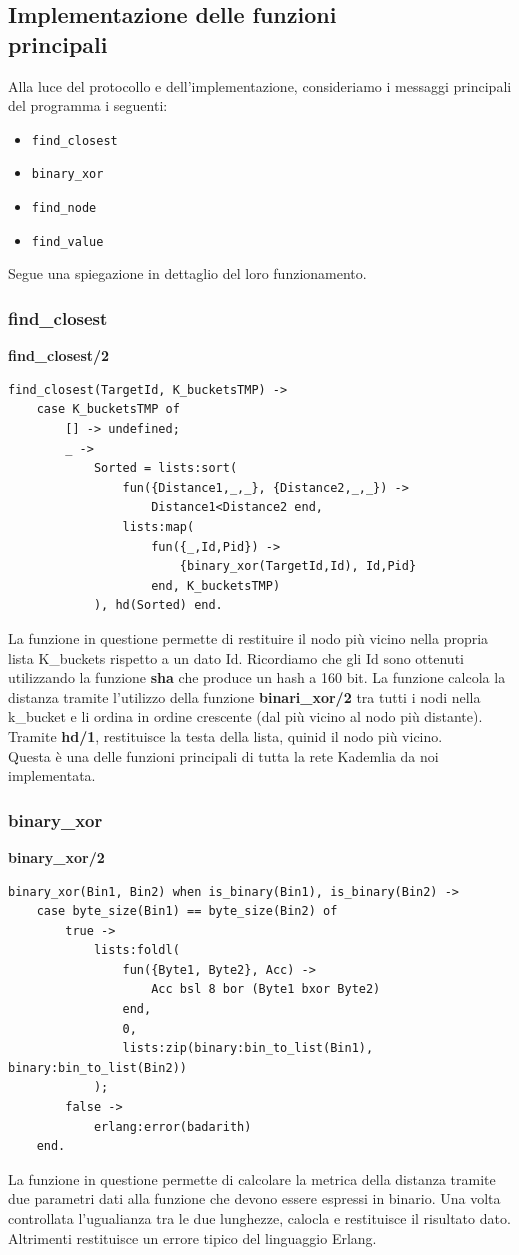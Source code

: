 \documentclass{article}
\begin{document}
\subsection{Implementazione delle funzioni \\ principali}
Alla luce del protocollo e dell'implementazione, consideriamo i messaggi principali del programma i seguenti:
\begin{itemize}
    \item \texttt{find\_closest}
    \item {\texttt{binary\_xor}}
    \item \texttt{find\_node}
    \item \texttt{find\_value}
\end{itemize}
Segue una spiegazione in dettaglio del loro funzionamento.
\subsubsection{find\_closest}
\textbf{find\_closest/2}
\begin{lstlisting}
find_closest(TargetId, K_bucketsTMP) ->
    case K_bucketsTMP of
        [] -> undefined;
        _ ->
            Sorted = lists:sort(
                fun({Distance1,_,_}, {Distance2,_,_}) ->
                    Distance1<Distance2 end,
                lists:map(
                    fun({_,Id,Pid}) ->
                        {binary_xor(TargetId,Id), Id,Pid}
                    end, K_bucketsTMP)
            ), hd(Sorted) end.
\end{lstlisting}
La funzione in questione permette di restituire il nodo più vicino nella propria lista K\_buckets rispetto a un dato Id. Ricordiamo che gli Id sono ottenuti utilizzando la funzione \textbf{sha} che produce un hash a 160 bit. La funzione calcola la distanza tramite l'utilizzo della funzione \textbf{binari\_xor/2} tra tutti i nodi nella k\_bucket e li ordina in ordine crescente (dal più vicino al nodo più distante). Tramite \textbf{hd/1}, restituisce la testa della lista, quinid il nodo più vicino.\\ 
Questa è una delle funzioni principali di tutta la rete Kademlia da noi implementata.
\subsubsection{binary\_xor}
\textbf{binary\_xor/2}
\begin{lstlisting}
binary_xor(Bin1, Bin2) when is_binary(Bin1), is_binary(Bin2) ->
    case byte_size(Bin1) == byte_size(Bin2) of
        true ->
            lists:foldl(
                fun({Byte1, Byte2}, Acc) ->
                    Acc bsl 8 bor (Byte1 bxor Byte2)
                end,
                0,
                lists:zip(binary:bin_to_list(Bin1), binary:bin_to_list(Bin2))
            );
        false ->
            erlang:error(badarith)
    end.
\end{lstlisting}
La funzione in questione permette di calcolare la metrica della distanza tramite due parametri dati alla funzione che devono essere espressi in binario. Una volta controllata l'ugualianza tra le due lunghezze, calocla e restituisce il risultato dato. Altrimenti restituisce un errore tipico del linguaggio Erlang.
\end{document}
